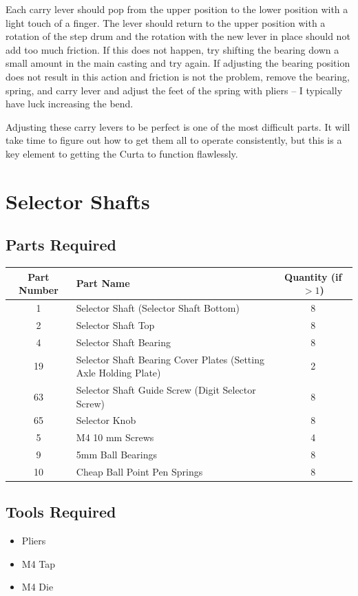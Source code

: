 \documentclass[openany]{book}
\begin{document}
Each carry lever should pop from the upper position to the lower position with a light touch of a finger. The lever should return to the upper position with a rotation of the step drum and the rotation with the new lever in place should not add too much friction. If this does not happen, try shifting the bearing down a small amount in the main casting and try again. If adjusting the bearing position does not result in this action and friction is not the problem, remove the bearing, spring, and carry lever and adjust the feet of the spring with pliers -- I typically have luck increasing the bend.

Adjusting these carry levers to be perfect is one of the most difficult parts. It will take time to figure out how to get them all to operate consistently, but this is a key element to getting the Curta to function flawlessly.



\chapter{Selector Shafts}
\section{Parts Required}
\begin{table}[!ht]
	\centering
	\begin{tabular}{clc}
		Part Number & Part Name & Quantity (if $>1$) \\ \hline
		1 & Selector Shaft (Selector Shaft Bottom) & 8 \\
		2 & Selector Shaft Top & 8 \\
		4 & Selector Shaft Bearing & 8 \\
		19 & Selector Shaft Bearing Cover Plates (Setting Axle Holding Plate) & 2 \\
		63 & Selector Shaft Guide Screw (Digit Selector Screw) & 8 \\
		65 & Selector Knob & 8 \\  \hline \hline 
		5 & M4 10 mm Screws & 4 \\
		9 & 5mm Ball Bearings & 8 \\
		10 & Cheap Ball Point Pen Springs & 8 
	\end{tabular}
\end{table}

\section{Tools Required}
\begin{itemize}
	\item Pliers
	\item M4 Tap
	\item M4 Die
\end{itemize}
\end{document}
